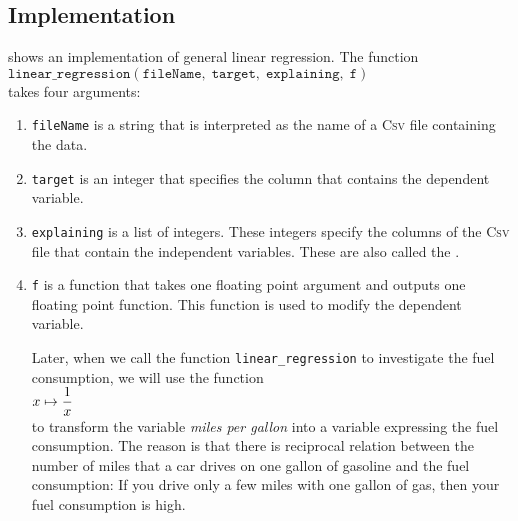 \subsection{Implementation}
 shows an implementation of general linear regression.
The function
\\[0.2cm]
\hspace*{1.3cm}
$\mathtt{linear\_regression}(\mathtt{fileName},\; \mathtt{target},\; \mathtt{explaining},\; \mathtt{f})$
\\[0.2cm]
takes four arguments:
\begin{enumerate}
\item \texttt{fileName} is a string that is interpreted as the name of a \textsc{Csv} file containing the data.
\item \texttt{target} is an integer that specifies the column that contains the dependent variable. 
\item \texttt{explaining} is a list of integers.  These integers specify the columns of the \textsc{Csv} file
      that contain the independent variables.  These are also called the .
\item \texttt{f} is a function that takes one floating point argument and outputs one floating point function.
      This function is used to modify the dependent variable.

      Later, when we call the function \texttt{linear\_regression} to investigate the fuel consumption, we will
      use the function
      \\[0.2cm]
      \hspace*{1.3cm}
      $\displaystyle x \mapsto \frac{1}{x}$
      \\[0.2cm]
      to transform the variable \textsl{miles per gallon} into a variable expressing the fuel consumption.  The
      reason is that there is reciprocal relation between the number of miles that a car drives on one gallon
      of gasoline and the fuel consumption:  If you drive only a few miles with one gallon of gas, then your
      fuel consumption is high.
\end{enumerate}

